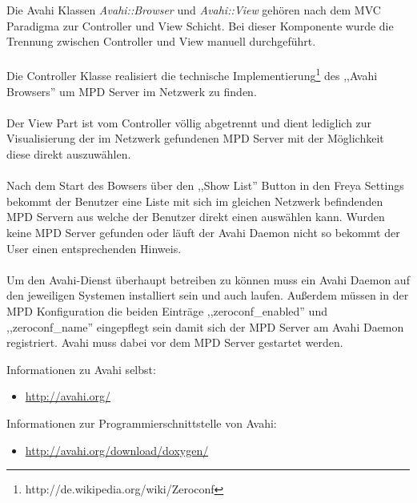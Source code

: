 Die Avahi Klassen \emph{Avahi::Browser} und \emph{Avahi::View} gehören nach dem MVC Paradigma zur Controller und View Schicht. Bei
dieser Komponente wurde die Trennung zwischen Controller und View manuell durchgeführt.
\\
\\
Die Controller Klasse realisiert die technische Implementierung\footnote{http://de.wikipedia.org/wiki/Zeroconf} des ,,Avahi Browsers'' um MPD Server im Netzwerk zu finden.
\\
\\
Der View Part ist vom Controller völlig abgetrennt und dient lediglich zur Visualisierung der im Netzwerk gefundenen
MPD Server mit der Möglichkeit diese direkt auszuwählen.
\\
\\
Nach dem Start des Bowsers über den ,,Show List'' Button in den Freya Settings bekommt der Benutzer eine Liste mit sich im
gleichen Netzwerk befindenden MPD Servern aus welche der Benutzer direkt einen auswählen kann. Wurden keine MPD Server
gefunden oder läuft der Avahi Daemon nicht so bekommt der User einen entsprechenden Hinweis.
\\
\\
Um den Avahi-Dienst überhaupt betreiben zu können muss ein Avahi Daemon auf den jeweiligen
Systemen installiert sein und auch laufen. Außerdem müssen in der MPD Konfiguration die beiden Einträge ,,zeroconf\_enabled'' und ,,zeroconf\_name''
eingepflegt sein damit sich der MPD Server am Avahi Daemon registriert. Avahi muss dabei vor dem MPD Server gestartet werden.

Informationen zu Avahi selbst:
\begin{itemize}
\item \url{http://avahi.org/}
\end{itemize}

Informationen zur Programmierschnittstelle von Avahi:
\begin{itemize}
\item \url{http://avahi.org/download/doxygen/}
\end{itemize}

